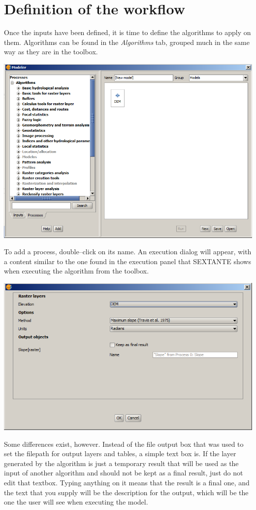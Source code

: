 \section{Definition of the workflow}

Once the inputs have been defined, it is time to define the algorithms to apply on them. Algorithms can be found in the \emph{Algorithms} tab, grouped much in the same way as they are in the toolbox.

\begin{center}
\includegraphics[width=.8\columnwidth]{models_parameters3.png}
\end{center}

To add a process, double--click on its name. An execution dialog will appear, with a content similar to the one found in the execution panel that SEXTANTE shows when executing the algorithm from the toolbox.

\begin{center}
\includegraphics[width=.8\columnwidth]{models_parameters4.png}
\end{center}

Some differences exist, however. Instead of the file output box that was used to set the filepath for output layers and tables, a simple text box is. If the layer generated by the algorithm is just a temporary result that will be used as the input of another algorithm and should not be kept as a final result, just do not edit that textbox. Typing anything on it means that the result is a final one, and the text that you supply will be the description for the output, which will be the one the user will see when executing the model. 

